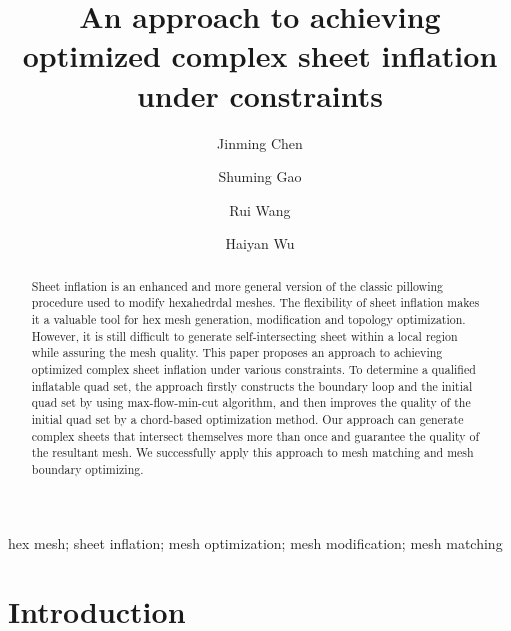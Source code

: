 \documentclass[final,5p,times,twocolumn]{elsarticle}
\begin{document}
\begin{frontmatter}

\title{An approach to achieving optimized complex sheet inflation under constraints}

\author[1]{Jinming Chen}
\author[1]{Shuming Gao}
\author[1]{Rui Wang}
\author[1]{Haiyan Wu}
\address[1]{CAD\&CG State Key Laboratory, Zhejiang University, Hangzhou, China}

\begin{abstract}
Sheet inflation is an enhanced and more general version of the classic pillowing procedure\cite{Mitchell:1995wa} used to modify hexahedrdal meshes. The flexibility of sheet inflation makes it a valuable tool for hex mesh generation, modification and topology optimization. However, it is still difficult to generate self-intersecting sheet within a local region while assuring the mesh quality. This paper proposes an approach to achieving optimized complex sheet inflation under various constraints. To determine a qualified inflatable quad set, the approach firstly constructs the boundary loop and the initial quad set by using max-flow-min-cut algorithm, and then improves the quality of the initial quad set by a chord-based optimization method. Our approach can generate complex sheets that intersect themselves more than once and guarantee the quality of the resultant mesh. We successfully apply this approach to mesh matching and mesh boundary optimizing.
\end{abstract}

\begin{keyword}
hex mesh; sheet inflation; mesh optimization; mesh modification; mesh matching

\end{keyword}

\end{frontmatter}


\section{Introduction}
\label{sec:intro}
\end{document}
